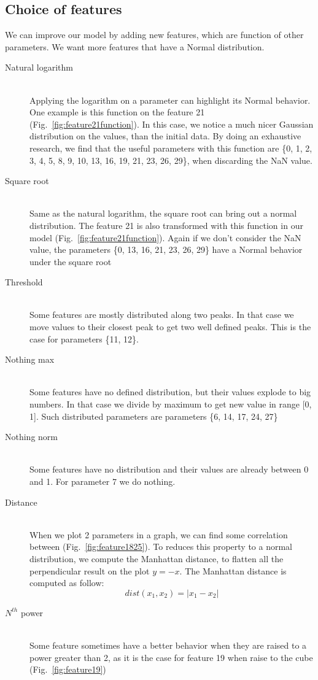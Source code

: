 \documentclass[10pt,conference,compsocconf]{IEEEtran}
\begin{document}
	\subsection{Choice of features}
	
	We can improve our model by adding new features, which are function of other parameters. We want more features that have a Normal distribution. 
	\begin{description}
		\item[Natural logarithm] \ \\
		Applying the logarithm on a parameter can highlight its Normal behavior. One example is this function on the feature 21 (Fig.~\ref{fig:feature21function}). In this case, we notice a much nicer Gaussian distribution on the values, than the initial data. By doing an exhaustive research, we find that the useful parameters with this function are \{0, 1, 2, 3, 4, 5, 8, 9, 10, 13, 16, 19, 21, 23, 26, 29\}, when discarding the NaN value.
		\item[Square root] \ \\
		Same as the natural logarithm, the square root can bring out a normal distribution. The feature 21 is also transformed with this function in our model (Fig.~\ref{fig:feature21function}). Again if we don't consider the NaN value, the parameters \{0, 13, 16, 21, 23, 26, 29\} have a Normal behavior under the square root
		\item[Threshold] \ \\
		Some features are mostly distributed along two peaks. In that case we move values to their closest peak to get two well defined peaks. This is the case for parameters \{11, 12\}.
		\item[Nothing max] \ \\
		Some features have no defined distribution, but their values explode to big numbers. In that case we divide by maximum to get new value in range [0, 1]. Such distributed parameters are parameters \{6, 14, 17, 24, 27\}
		\item[Nothing norm] \ \\
		Some features have no distribution and their values are already between 0 and 1. For parameter 7 we do nothing.
		\item[Distance] \ \\
		When we plot 2 parameters in a graph, we can find some correlation between (Fig.~\ref{fig:feature1825}). To reduces this property to a normal distribution, we compute the Manhattan distance, to flatten all the perpendicular result on the plot $y = -x$. The Manhattan distance is computed as follow:
		$$dist(x_1, x_2) = |x_1 - x_2|$$ 
		
		\item[$N^{th}$ power] \ \\
		Some feature sometimes have a better behavior when they are raised to a power greater than 2, as it is the case for feature 19 when raise to the cube (Fig.~\ref{fig:feature19})
	\end{description}
	
\end{document}
